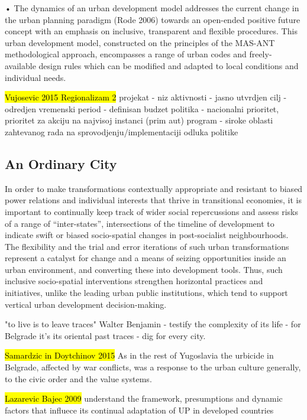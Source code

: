 \documentclass[11pt]{report}
\begin{document}
•	The dynamics of an urban development model addresses the current change in the urban planning paradigm (Rode 2006) towards an open-ended positive future concept with an emphasis on inclusive, transparent and flexible procedures. This urban development model, constructed on the principles of the MAS-ANT methodological approach, encompasses a range of urban codes and freely-available design rules which can be modified and adapted to local conditions and individual needs.

\hl{Vujosevic 2015 Regionalizam 2}
projekat - niz aktivnosti - jasno utvrdjen cilj - odredjen vremenski period - definisan budzet
politika - nacionalni prioritet, prioritet za akciju na najvisoj instanci (prim aut)
program - siroke oblasti zahtevanog rada na sprovodjenju/implementaciji odluka politike

\subsection{An Ordinary City}

In order to make transformations contextually appropriate and resistant to biased power relations and individual interests that thrive in transitional economies, it is important to continually keep track of wider social repercussions and assess risks of a range of “inter-states”, intersections of the timeline of development to indicate swift or biased socio-spatial changes in post-socialist neighbourhoods. The flexibility and the trial and error iterations of such urban transformations represent a catalyst for change and a means of seizing opportunities inside an urban environment, and converting these into development tools. Thus, such inclusive socio-spatial interventions strengthen horizontal practices and initiatives, unlike the leading urban public institutions, which tend to support vertical urban development decision-making. 

"to live is to leave traces" Walter Benjamin - testify the complexity of its life - for Belgrade it's its oriental past traces - dig for every city.

\hl{Samardzic in Doytchinov 2015} 
As in the rest of Yugoslavia the urbicide in  Belgrade,  affected  by  war  conflicts,  was  a  response  to  the  urban  culture generally, to the civic order and the value systems.

\hl{Lazarevic Bajec 2009}
understand the framework, presumptions and dynamic factors that influece its continual adaptation of UP in developed countries
\end{document}

